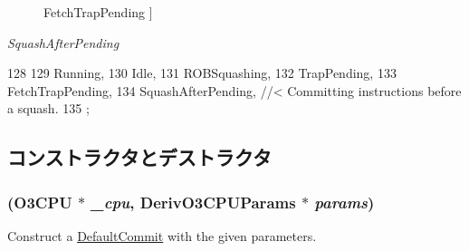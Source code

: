 \begin{Desc}
\begin{description}
{\hypertarget{classDefaultCommit_ae2739961013a00cede621d4d72f2173ca757a5840686b21827966401ca2499141}{
FetchTrapPending}
\label{classDefaultCommit_ae2739961013a00cede621d4d72f2173ca757a5840686b21827966401ca2499141}
}]\item[{\em 
\hypertarget{classDefaultCommit_ae2739961013a00cede621d4d72f2173ca1f0e8d98cfb4db458b98f0b5e3f49466}{
SquashAfterPending}
\label{classDefaultCommit_ae2739961013a00cede621d4d72f2173ca1f0e8d98cfb4db458b98f0b5e3f49466}
}]\end{description}
\end{Desc}




\begin{DoxyCode}
128                       {
129         Running,
130         Idle,
131         ROBSquashing,
132         TrapPending,
133         FetchTrapPending,
134         SquashAfterPending, //< Committing instructions before a squash.
135     };
\end{DoxyCode}


\subsection{コンストラクタとデストラクタ}
\hypertarget{classDefaultCommit_ac5ef93cb7a09f9a537c03bb1d002f7a2}{
\subsubsection[{DefaultCommit}]{ ({\bf O3CPU} $\ast$ {\em \_\-cpu}, \/  DerivO3CPUParams $\ast$ {\em params})}}
\label{classDefaultCommit_ac5ef93cb7a09f9a537c03bb1d002f7a2}
Construct a \hyperlink{classDefaultCommit}{DefaultCommit} with the given parameters. 


